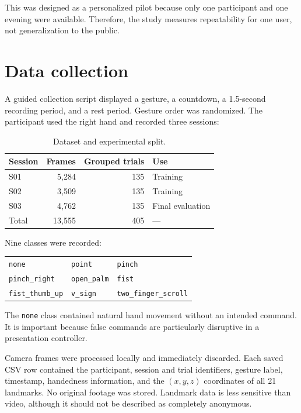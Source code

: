 \documentclass[11pt,a4paper]{article}
\begin{document}
This was designed as a personalized pilot because only one participant and one
evening were available. Therefore, the study measures repeatability for one
user, not generalization to the public.

\section{Data collection}

A guided collection script displayed a gesture, a countdown, a 1.5-second
recording period, and a rest period. Gesture order was randomized. The
participant used the right hand and recorded three sessions:

\begin{table}[ht]
\centering
\caption{Dataset and experimental split.}
\begin{tabular}{lrrl}
\toprule
Session & Frames & Grouped trials & Use \\
\midrule
S01 & 5,284 & 135 & Training \\
S02 & 3,509 & 135 & Training \\
S03 & 4,762 & 135 & Final evaluation \\
\midrule
Total & 13,555 & 405 & --- \\
\bottomrule
\end{tabular}
\end{table}

Nine classes were recorded:

\begin{center}
\begin{tabular}{lll}
\toprule
\texttt{none} & \texttt{point} & \texttt{pinch} \\
\texttt{pinch\_right} & \texttt{open\_palm} & \texttt{fist} \\
\texttt{fist\_thumb\_up} & \texttt{v\_sign} & \texttt{two\_finger\_scroll} \\
\bottomrule
\end{tabular}
\end{center}

The \texttt{none} class contained natural hand movement without an intended
command. It is important because false commands are particularly disruptive in
a presentation controller.

Camera frames were processed locally and immediately discarded. Each saved CSV
row contained the participant, session and trial identifiers, gesture label,
timestamp, handedness information, and the $(x,y,z)$ coordinates of all 21
landmarks. No original footage was stored. Landmark data is less sensitive than
video, although it should not be described as completely anonymous.
\end{document}
